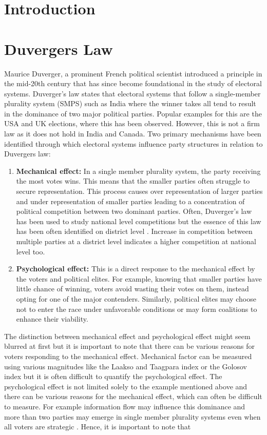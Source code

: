\section{Introduction}

\section{Duvergers Law}
Maurice Duverger, a prominent French political scientist introduced a principle in the mid-20th century that has since become foundational in the study of electoral systems. Duverger's law states that electoral systems that follow a single-member plurality system (SMPS) such as India where the winner takes all tend to result in the dominance of two major political parties. Popular examples for this are the USA and UK elections, where this has been observed. However, this is not a firm law as it does not hold in India and Canada.
Two primary mechanisms have been identified through which electoral systems influence party structures in relation to Duvergers law:
 \begin{enumerate}
     \item \textbf{Mechanical effect:}  In a single member plurality system, the party receiving the most votes wins. This means that the smaller parties often struggle to secure representation. This process causes over representation of larger parties and under representation of smaller parties leading to a concentration of political competition between two dominant parties. Often, Duverger's law has been used to study national level competitions but the essence of this law has been often identified on district level \citep{cox1997making,GALLAGHER199133,lijphart1994,rae1971political}. Increase in competition between multiple parties at a district level indicates a higher competition at national level too.
     \item \textbf{Psychological effect:} This is a direct response to the mechanical effect by the voters and political elites. For example, knowing that smaller parties have little chance of winning, voters avoid wasting their votes on them, instead opting for one of the major contenders. Similarly, political elites may choose not to enter the race under unfavorable conditions or may form coalitions to enhance their viability.
 \end{enumerate}
 The distinction between mechanical effect and psychological effect might seem blurred at first but it is important to note that there can be various reasons for voters responding to the mechanical effect. Mechanical factor can be measured using various magnitudes like the Laakso and Taagpara index \citep{laakso1979effective} or the Golosov index \citep{golosov2010effective} but it is often difficult to quantify the psychological effect. The psychological effect is not limited solely to the example mentioned above and there can be various reasons for the mechanical effect, which can often be difficult to measure. For example information flow may influence this dominance and more than two parties may emerge in single member plurality systems even when all voters are strategic \citep{clough2007strategic}. Hence, it is important to note that 

